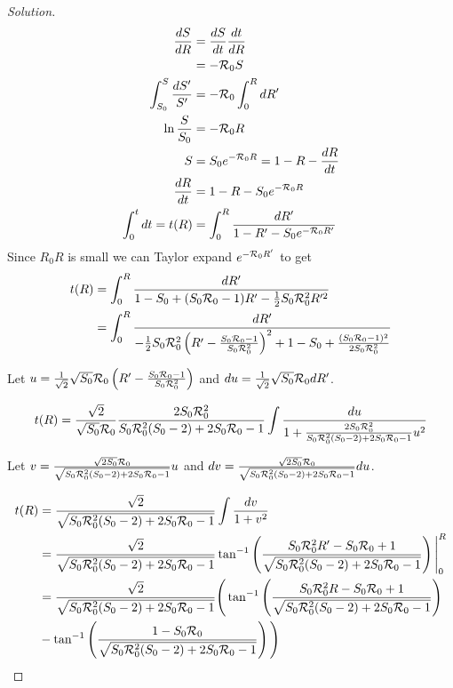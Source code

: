 \documentclass[12pt]{article}
\begin{document}
\begin{enumerate}[(a)]
\begin{enumerate}[(i)]
{\begin{proof}[Solution]
{	\begin{align}
		\frac{dS}{dR} &= \frac{dS}{dt} \frac{dt}{dR} \\
				     &= -{\cal R}_0 S \\
		\int_{S_0}^{S} \frac{dS'}{S'} &= -{\cal R}_0 \int_{0}^{R} dR' \\
		\ln{\frac{S}{S_0}} &= -{\cal R}_0 R \\
		S &= S_0 e^{-{\cal R}_0 R} = 1 - R - \frac{dR}{dt} \\
		\frac{dR}{dt} &= 1 - R - S_0 e^{-{\cal R}_0 R} \\
		\int_{0}^{t} dt = t(R) &= \int_{0}^{R} \frac{dR'}{1 - R' - S_0 e^{-{\cal R}_0 R'}}
	\end{align}
	Since $R_0 R$ is small we can Taylor expand $e^{-{\cal R}_0 R'}$ to get
	\begin{align}
		t(R) &= \int_{0}^{R} \frac{dR'}{1 - S_0 + (S_0{\cal R}_0 -1)R' -\frac{1}{2}S_0{\cal R}_0^2R'^2} \\
		&= \int_{0}^{R} \frac{dR'}{-\frac{1}{2}S_0{\cal R}_0^2 \left (R^\prime - \frac{S_0{\cal R}_0 - 1}{S_0{\cal R}_0^2}  \right )^2  +1-S_0+\frac{(S_0{\cal R}_0 -1)^2}	{2S_0{\cal R}_0^2}  }
	\end{align}
	
	Let $u=\frac{1}{\sqrt{2}}\sqrt{S_0}{\cal R}_0 \left (R' - \frac{S_0{\cal R}_0 - 1}{S_0{\cal R}_0^2}  \right )$ and $du=\frac{1}{\sqrt{2}}\sqrt{S_0}{\cal R}_0 dR'$.
	
	\begin{equation}
		t(R) =\frac{\sqrt{2}}{\sqrt{S_0}{\cal R}_0} \frac{2S_0{\cal R}_0^2}{S_0{\cal R}_0^2(S_0-2)+2S_0{\cal R}_0 -1} \int \frac{du}{1+\frac{2S_0{\cal R}_0^2}{S_0{\cal R}_0^2(S_0-2)+2S_0{\cal R}_0 -1}u^2} 
	\end{equation}
	
	Let $v=\frac{\sqrt{2S_0}{\cal R}_0}{\sqrt{S_0{\cal R}_0^2(S_0-2)+2S_0{\cal R}_0 -1}}u$ and $dv=\frac{\sqrt{2S_0}{\cal R}_0}{\sqrt{S_0{\cal R}_0^2(S_0-2)+2S_0{\cal R}_0 -1}}du$.
	
	\begin{align}
		t(R) &= \frac{\sqrt{2}}{\sqrt{S_0{\cal R}_0^2(S_0-2)+2S_0{\cal R}_0 -1}} \int \frac{dv}{1+v^2}  \\
		&= \frac{\sqrt{2}}{\sqrt{S_0{\cal R}_0^2(S_0-2)+2S_0{\cal R}_0 -1}} \tan ^{-1} \left ( \frac{S_0{\cal R}_0^2R' - S_0{\cal R}_0 +1}{\sqrt{S_0{\cal R}_0^2(S_0-2)+2S_0{\cal R}_0 -1}} \right ) \Bigg |_0^R \\
		&= \frac{\sqrt{2}}{\sqrt{S_0{\cal R}_0^2(S_0-2)+2S_0{\cal R}_0 -1}} \Bigg ( \tan ^{-1} \left ( \frac{S_0{\cal R}_0^2R - S_0{\cal R}_0 +1}{\sqrt{S_0{\cal R}_0^2(S_0-2)+2S_0{\cal R}_0 -1}} \right ) \nonumber \\
		&-\tan ^{-1} \left ( \frac{1 - S_0{\cal R}_0 }{\sqrt{S_0{\cal R}_0^2(S_0-2)+2S_0{\cal R}_0 -1}} \right )  \Bigg ) 
	\end{align}

}
\end{proof}}
\end{enumerate}
\end{enumerate}
\end{document}
